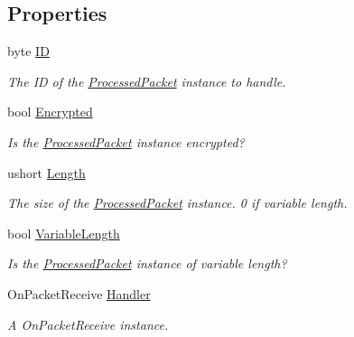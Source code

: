 \subsection*{Properties}
\begin{DoxyCompactItemize}
\item 
byte \hyperlink{class_gonzo_net_1_1_packet_handler_a6fc3d34bae9ece063fae2d857b10ddf1}{I\+D}
\begin{DoxyCompactList}\small\item\em The I\+D of the \hyperlink{class_gonzo_net_1_1_processed_packet}{Processed\+Packet} instance to handle. \end{DoxyCompactList}\item 
bool \hyperlink{class_gonzo_net_1_1_packet_handler_a874391e7467f18ccac385fdfe5e51f96}{Encrypted}
\begin{DoxyCompactList}\small\item\em Is the \hyperlink{class_gonzo_net_1_1_processed_packet}{Processed\+Packet} instance encrypted? \end{DoxyCompactList}\item 
ushort \hyperlink{class_gonzo_net_1_1_packet_handler_aea1063b73fba1dda5f063d7a0ef6e3c2}{Length}
\begin{DoxyCompactList}\small\item\em The size of the \hyperlink{class_gonzo_net_1_1_processed_packet}{Processed\+Packet} instance. 0 if variable length. \end{DoxyCompactList}\item 
bool \hyperlink{class_gonzo_net_1_1_packet_handler_a8a43a8b52bdda7364087bea53acc2ad2}{Variable\+Length}
\begin{DoxyCompactList}\small\item\em Is the \hyperlink{class_gonzo_net_1_1_processed_packet}{Processed\+Packet} instance of variable length? \end{DoxyCompactList}\item 
On\+Packet\+Receive \hyperlink{class_gonzo_net_1_1_packet_handler_a1209e12f51b42552b896e0483b6bc170}{Handler}
\begin{DoxyCompactList}\small\item\em A On\+Packet\+Receive instance. \end{DoxyCompactList}\end{DoxyCompactItemize}



